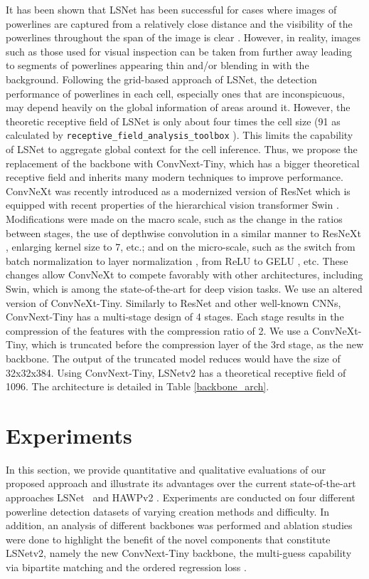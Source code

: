 \documentclass[journal]{IEEEtran}
\begin{document}
It has been shown that LSNet has been successful for cases where images of powerlines are captured from a relatively close distance and the visibility of the powerlines throughout the span of the image is clear \cite{Nguyen2020}. However, in reality, images such as those used for visual inspection can be taken from further away leading to segments of powerlines appearing thin and/or blending in with the background. Following the grid-based approach of LSNet, the detection performance of powerlines in each cell, especially ones that are inconspicuous, may depend heavily on the global information of areas around it. However, the theoretic receptive field of LSNet is only about four times the cell size (91 as calculated by \texttt{receptive\_field\_analysis\_toolbox} \cite{receptive_field_analysis_toolbox}). This limits the capability of LSNet to aggregate global context for the cell inference. Thus, we propose the replacement of the backbone with ConvNext-Tiny, which has a bigger theoretical receptive field and inherits many modern techniques to improve performance. ConvNeXt was recently introduced as a modernized version of ResNet \cite{resnet} which is equipped with recent properties of the hierarchical vision transformer Swin \cite{swin}. Modifications were made on the macro scale, such as the change in the ratios between stages, the use of depthwise convolution in a similar manner to ResNeXt \cite{resnext}, enlarging kernel size to 7, etc.; and on the micro-scale, such as the switch from batch normalization \cite{batchnorm} to layer normalization \cite{layernorm}, from ReLU \cite{relu} to GELU \cite{gelu}, etc. These changes allow ConvNeXt to compete favorably with other architectures, including Swin, which is among the state-of-the-art for deep vision tasks. We use an altered version of ConvNeXt-Tiny. Similarly to ResNet and other well-known CNNs, ConvNext-Tiny has a multi-stage design of 4 stages. Each stage results in the compression of the features with the compression ratio of 2. We use a ConvNeXt-Tiny, which is truncated before the compression layer of the 3rd stage, as the new backbone. The output of the truncated model reduces would have the size of 32x32x384. Using ConvNext-Tiny, LSNetv2 has a theoretical receptive field of 1096. The architecture is detailed in Table \ref{backbone_arch}.

\section{Experiments}
In this section, we provide quantitative and qualitative evaluations of our proposed approach and illustrate its advantages over the current state-of-the-art approaches LSNet~\cite{Nguyen2020} and HAWPv2 \cite{hawpv2}. Experiments are conducted on four different powerline detection datasets of varying creation methods and difficulty. In addition, an analysis of different backbones was performed and ablation studies were done to highlight the benefit of the novel components that constitute LSNetv2, namely the new ConvNext-Tiny backbone, the multi-guess capability via bipartite matching and the ordered regression loss .
\end{document}

